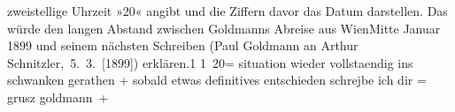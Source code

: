 \begin{ledgroupsized}[t]{13cm}
{{{                  zweistellige Uhrzeit »20« angibt und die Ziffern davor das Datum
                  darstellen. Das würde den langen Abstand zwischen Goldmanns Abreise aus WienMitte Januar 1899 und seinem nächsten Schreiben (Paul Goldmann an Arthur Schnitzler, 5. 3. [1899]) erklären.}}}\label{K_L02679-1h}1{ }1 20=\pend
           \pstart
           \noindent{}situation wieder vollstaendig ins schwanken gerathen +\pend
           \pstart
           sobald etwas definitives entschieden schrejbe ich dir =\pend
           \pstart grusz \spacefill\mbox{goldmann +}\pend{}
         
         \endnumbering{}\end{ledgroupsized}  \newcommand{\dateiname}{L02679}\newcommand{\titel}{Paul Goldmann an Arthur Schnitzler, [31. 1. 1899?]}\newcommand{\editorInnen}{Martin Anton Müller und Laura Untner}
      